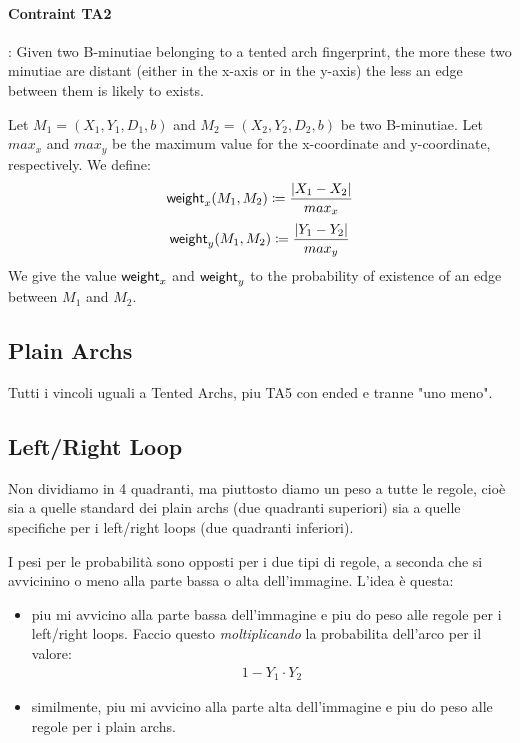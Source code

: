 \documentclass[8pt]{article}
\begin{document}
\paragraph{Contraint TA2}:
Given two B-minutiae belonging to a tented arch fingerprint, the more
these two minutiae are distant (either in the x-axis or in the y-axis)
the less an edge between them is likely to exists.

Let $M_1=(X_1,Y_1,D_1,b)$ and $M_2=(X_2,Y_2,D_2,b)$ be two B-minutiae.
Let $max_x$ and $max_y$ be the maximum value for the x-coordinate and
y-coordinate, respectively. We define:
  \begin{align*}
    \textsf{weight}_x(M_1,M_2) \coloneqq
    \frac{\lvert X_1 - X_2 \rvert}{max_x}
  \end{align*}
  \begin{align*}
    \textsf{weight}_y(M_1,M_2) \coloneqq
    \frac{\lvert Y_1 - Y_2 \rvert}{max_y}
  \end{align*}
We give the value $\textsf{weight}_x$ and $\textsf{weight}_y$ to the probability 
of existence of an edge between $M_1$ and $M_2$.




\subsection{Plain Archs}
Tutti i vincoli uguali a Tented Archs, piu TA5 con ended e tranne "uno meno".


\subsection{Left/Right Loop}
Non dividiamo in 4 quadranti, ma piuttosto diamo un peso a tutte le
regole, cioè sia a quelle standard dei plain archs (due quadranti superiori)
sia a quelle specifiche per i left/right loops (due quadranti inferiori).

I pesi per le probabilità sono opposti per i due tipi di regole, a seconda
che si avvicinino o meno alla parte bassa o alta dell'immagine. L'idea è
questa:
  \begin{itemize}
    \item
      piu mi avvicino alla parte bassa dell'immagine e piu do peso alle
      regole per i left/right loops. Faccio questo \emph{moltiplicando}
      la probabilita dell'arco per il valore:
        \begin{align*}
          1 - Y_1 \cdot Y_2
        \end{align*}
    \item
      similmente, piu mi avvicino alla parte alta dell'immagine e piu 
      do peso alle regole per i plain archs.
  \end{itemize}
\end{document}
